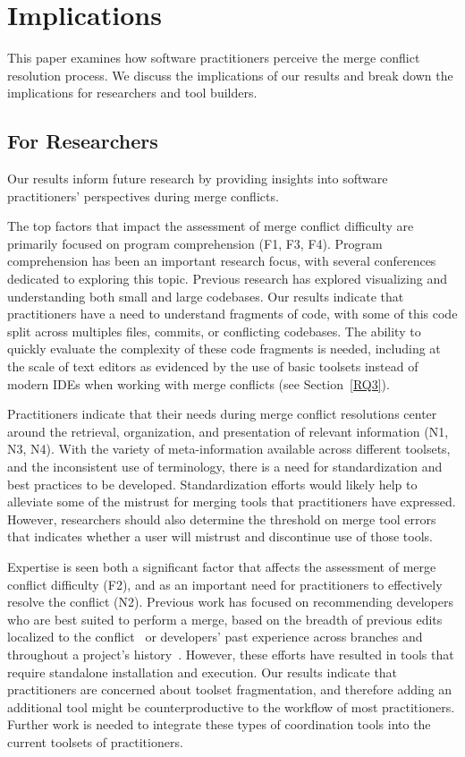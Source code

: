 \section{Implications}\label{implications}
This paper examines how software practitioners perceive the merge conflict resolution process.
We discuss the implications of our results and break down the implications for researchers and tool builders.

\subsection{For Researchers}
Our results inform future research by providing insights into software practitioners' perspectives during merge conflicts.

The top factors that impact the assessment of merge conflict difficulty are primarily focused on program comprehension (F1, F3, F4).
Program comprehension has been an important research focus, with several conferences dedicated to exploring this topic.
Previous research has explored visualizing and understanding both small and large codebases.
Our results indicate that practitioners have a need to understand fragments of code, with some of this code split across multiples files, commits, or conflicting codebases.
The ability to quickly evaluate the complexity of these code fragments is needed, including at the scale of text editors as evidenced by the use of basic toolsets instead of modern IDEs when working with merge conflicts (see Section~\ref{RQ3}).

Practitioners indicate that their needs during merge conflict resolutions center around the retrieval, organization, and presentation of relevant information (N1, N3, N4).
With the variety of meta-information available across different toolsets, and the inconsistent use of terminology, there is a need for standardization and best practices to be developed.
Standardization efforts would likely help to alleviate some of the mistrust for merging tools that practitioners have expressed.
However, researchers should also determine the threshold on merge tool errors that indicates whether a user will mistrust and discontinue use of those tools.

Expertise is seen both a significant factor that affects the assessment of merge conflict difficulty (F2), and as an important need for practitioners to effectively resolve the conflict (N2).
Previous work has focused on recommending developers who are best suited to perform a merge, based on the breadth of previous edits localized to the conflict~\cite{dasilva2015niche} or developers' past experience across branches and throughout a project's history~\cite{CostaSarma}.
However, these efforts have resulted in tools that require standalone installation and execution.
Our results indicate that practitioners are concerned about toolset fragmentation, and therefore adding an additional tool might be counterproductive to the workflow of most practitioners.
Further work is needed to integrate these types of coordination tools into the current toolsets of practitioners.

